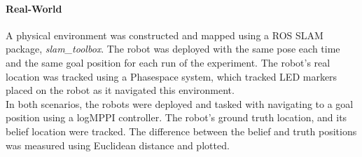 \documentclass[10.5pt]{article}
\begin{document}
\paragraph{Real-World}
A physical environment was constructed and mapped using a ROS SLAM package, \textit{slam\_toolbox}\cite{Macenski2021}. The robot was deployed with the same pose each time and the same goal position for each run of the experiment. The robot's real location was tracked using a Phasespace system, which tracked LED markers placed on the robot as it navigated this environment.
\\
In both scenarios, the robots were deployed and tasked with navigating to a goal position using a logMPPI controller\cite{logMPPI}. The robot's ground truth location, and its belief location were tracked. The difference between the belief and truth positions was measured using Euclidean distance and plotted.
\end{document}
